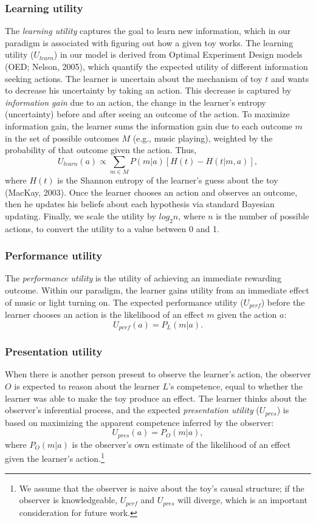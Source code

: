 \documentclass[10pt, letterpaper]{article}
\begin{document}
\subsubsection{Learning utility}\label{learning-utility}

The \emph{learning utility} captures the goal to learn new information,
which in our paradigm is associated with figuring out how a given toy
works. The learning utility (\(U_{learn}\)) in our model is derived from
Optimal Experiment Design models (OED; Nelson, 2005), which quantify the
expected utility of different information seeking actions. The learner
is uncertain about the mechanism of toy \(t\) and wants to decrease his
uncertainty by taking an action. This decrease is captured by
\emph{information gain} due to an action, the change in the learner's
entropy (uncertainty) before and after seeing an outcome of the action.
To maximize information gain, the learner sums the information gain due
to each outcome \(m\) in the set of possible outcomes \(M\) (e.g., music
playing), weighted by the probability of that outcome given the action.
Thus,
\[ U_{learn}(a) \propto \sum_{m \in M}{P(m|a)}[{H(t) - H(t | m,a)}],\]
\noindent
where \(H(t)\) is the Shannon entropy of the learner's guess about the
toy (MacKay, 2003). Once the learner chooses an action and observes an
outcome, then he updates his beliefs about each hypothesis via standard
Bayesian updating. Finally, we scale the utility by \(log_2n\), where
\(n\) is the number of possible actions, to convert the utility to a
value between 0 and 1.

\subsubsection{Performance utility}\label{performance-utility}

The \emph{performance utility} is the utility of achieving an immediate
rewarding outcome. Within our paradigm, the learner gains utility from
an immediate effect of music or light turning on. The expected
performance utility (\(U_{perf}\)) before the learner chooses an action
is the likelihood of an effect \(m\) given the action \(a\):
\[ U_{perf}(a) = P_L(m | a).\] \noindent

\subsubsection{Presentation utility}\label{presentation-utility}

When there is another person present to observe the learner's action,
the observer \(O\) is expected to reason about the learner \(L\)'s
competence, equal to whether the learner was able to make the toy
produce an effect. The learner thinks about the observer's inferential
process, and the expected \emph{presentation utility} (\(U_{pres}\)) is
based on maximizing the apparent competence inferred by the observer:
\[ U_{pres}(a) = P_O(m | a),\] \noindent
where \(P_O(m | a)\) is the observer's own estimate of the likelihood of
an effect given the learner's action.\footnote{We assume that the
  observer is naive about the toy's causal structure; if the observer is
  knowledgeable, \(U_{perf}\) and \(U_{pres}\) will diverge, which is an
  important consideration for future work.}
\end{document}
